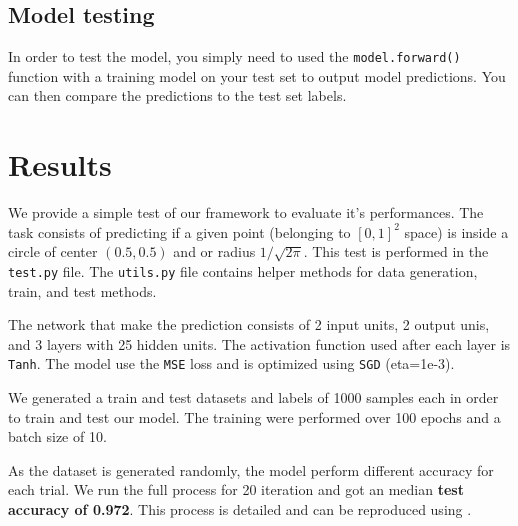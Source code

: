 \documentclass[10pt,conference,compsocconf]{IEEEtran}
\begin{document}
\subsection{Model testing}
In order to test the model, you simply need to used the \texttt{model.forward()} function with a training model on your test set to output model predictions. You can then compare the predictions to the test set labels.

\section{Results}

We provide a simple test of our framework to evaluate it's performances. The task consists of predicting if a given point (belonging to $[0, 1]^2$ space) is inside a circle of center $(0.5, 0.5)$ and or radius $1/\sqrt{2\pi}$. This test is performed in the \texttt{test.py} file. The \texttt{utils.py} file contains helper methods for data generation, train, and test methods. 

The network that make the prediction consists of 2 input units, 2 output unis, and 3 layers with 25 hidden units. The activation function used after each layer is \texttt{Tanh}. The model use the \texttt{MSE} loss and is optimized using \texttt{SGD} (eta=1e-3). 

We generated a train and test datasets and labels of 1000 samples each in order to train and test our model. The training were performed over 100 epochs and a batch size of 10. 

As the dataset is generated randomly, the model perform different accuracy for each trial. We run the full process for 20 iteration and got an median \textbf{test accuracy of 0.972}. This process is detailed and can be reproduced using .
\end{document}
